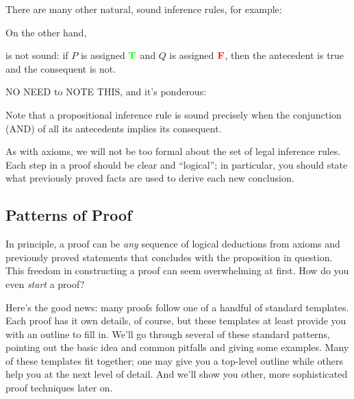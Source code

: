 There are many other natural, sound inference rules, for example:
\begin{rul*}
\end{rul*}

\begin{editingnotes}

\begin{rul*}
\end{rul*}

\end{editingnotes}

\begin{rul*}
\end{rul*}

On the other hand,
\begin{nonrul*}
\end{nonrul*}
\noindent is not sound: if $P$ is assigned $\textcolor{green}{\mathbf{T}}$ and $Q$ is assigned
$\textcolor{red}{\mathbf{F}}$, then the antecedent is true and the consequent is not.

\begin{editingnotes}
NO NEED to NOTE THIS, and it's ponderous:

Note that a propositional inference rule is sound precisely when the conjunction
(AND) of all its antecedents implies its consequent.
\end{editingnotes}

As with axioms, we will not be too formal about the set of legal inference
rules.  Each step in a proof should be clear and ``logical''; in
particular, you should state what previously proved facts are used to
derive each new conclusion.

\subsection{Patterns of Proof}

In principle, a proof can be \textit{any} sequence of logical
deductions from axioms and previously proved statements that concludes
with the proposition in question.  This freedom in constructing a
proof can seem overwhelming at first.  How do you even \textit{start}
a proof?

Here's the good news: many proofs follow one of a handful of standard
templates.  Each proof has it own details, of course, but these
templates at least provide you with an outline to fill in.  We'll go
through several of these standard patterns, pointing out the basic
idea and common pitfalls and giving some examples.  Many of these
templates fit together; one may give you a top-level outline while
others help you at the next level of detail.  And we'll show you
other, more sophisticated proof techniques later on.

